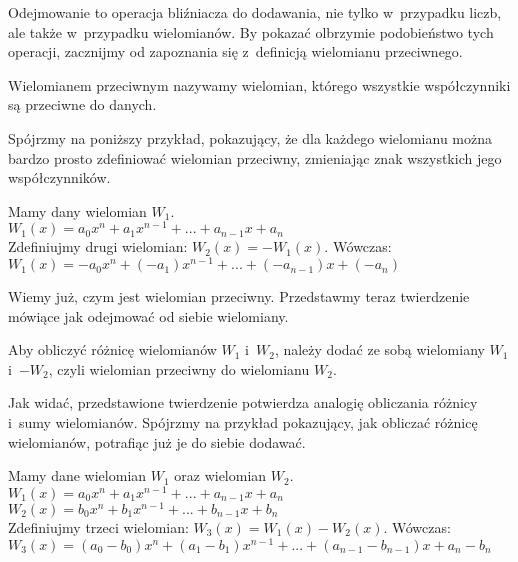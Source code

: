 Odejmowanie to operacja bliźniacza do dodawania, nie tylko w~przypadku liczb, ale także w~przypadku wielomianów. By pokazać olbrzymie podobieństwo tych operacji, zacznijmy od zapoznania się z~definicją wielomianu przeciwnego.

\begin{definition}
	$ $\\
	Wielomianem przeciwnym nazywamy wielomian, którego wszystkie współczynniki są przeciwne do danych.
\end{definition}

Spójrzmy na poniższy przykład, pokazujący, że dla każdego wielomianu można bardzo prosto zdefiniować wielomian przeciwny, zmieniając znak wszystkich jego współczynników.

\begin{example}
	$ $\\
	Mamy dany wielomian $W_1$. \\
	$W_1(x) = a_0x^n + a_1x^{n-1} + ... + a_{n-1}x + a_n$ \\
	Zdefiniujmy drugi wielomian: $W_2(x) = -W_1(x)$. Wówczas: \\
	$W_1(x) = -a_0x^n + (-a_1)x^{n-1} + ... + (-a_{n-1})x + (-a_n)$
\end{example}

Wiemy już, czym jest wielomian przeciwny. Przedstawmy teraz twierdzenie mówiące jak odejmować od siebie wielomiany.

\begin{theorem}
	$ $\\
	Aby obliczyć różnicę wielomianów $W_1$ i~$W_2$, należy dodać ze sobą wielomiany $W_1$ i~$-W_2$, czyli wielomian przeciwny do wielomianu $W_2$.
\end{theorem}

Jak widać, przedstawione twierdzenie potwierdza analogię obliczania różnicy i~sumy wielomianów. Spójrzmy na przykład pokazujący, jak obliczać różnicę wielomianów, potrafiąc już je do siebie dodawać.

\begin{example}
	$ $\\
	Mamy dane wielomian $W_1$ oraz wielomian $W_2$.
	$W_1(x) = a_0x^n + a_1x^{n-1} + ... + a_{n-1}x + a_n$ \\
	$W_2(x) = b_0x^n + b_1x^{n-1} + ... + b_{n-1}x + b_n$ \\
	Zdefiniujmy trzeci wielomian: $W_3(x) = W_1(x) - W_2(x)$. Wówczas: \\
	$W_3(x) = (a_0-b_0)x^n + (a_1-b_1)x^{n-1} + ... + (a_{n-1} - b_{n-1})x + a_n - b_n$
\end{example}

